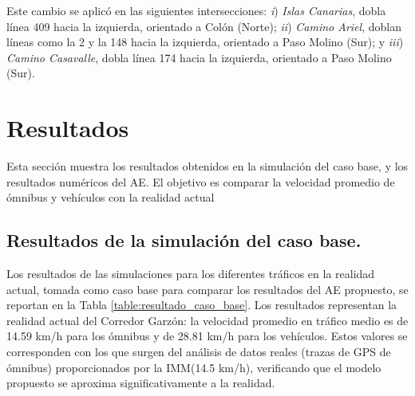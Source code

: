 Este cambio se aplicó en las siguientes intersecciones: \emph{i}) \emph{Islas Canarias}, dobla línea 409 hacia la izquierda, orientado a Colón (Norte); \emph{ii}) \emph{Camino Ariel}, doblan líneas como la  2 y la 148 hacia la izquierda, orientado a Paso Molino (Sur); y \emph{iii}) \emph{Camino Casavalle}, dobla línea 174 hacia la izquierda, orientado a Paso Molino (Sur).


\section{Resultados}
Esta sección muestra los resultados obtenidos en la simulación del caso base, y los resultados numéricos del AE. El objetivo es comparar la velocidad promedio de ómnibus y vehículos con la realidad actual 



\subsection{Resultados de la simulación del caso base.}

Los resultados de las simulaciones para los diferentes tráficos en la realidad actual, tomada como caso base para comparar los resultados del AE propuesto, se reportan en la Tabla \ref{table:resultado_caso_base}. Los resultados representan la realidad actual del Corredor Garzón: la velocidad promedio en tráfico medio es de 14.59 km/h para los ómnibus y de 28.81 km/h para los vehículos. Estos valores se corresponden con los que surgen del análisis de datos reales (trazas de GPS de ómnibus) proporcionados por la IMM(14.5 km/h), verificando que el modelo propuesto se aproxima significativamente a la realidad.

 
